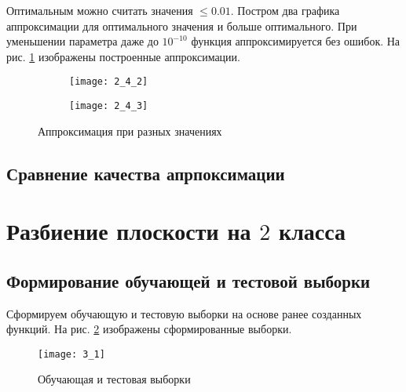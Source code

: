 Оптимальным можно считать значения  $\leq 0.01$. Постром два графика аппроксимации для оптимального значения  и больше оптимального. При уменьшении параметра даже до $10^{-10}$ функция аппроксимируется без ошибок. На рис. \ref{fig:2_4_2} изображены построенные аппроксимации.
\begin{figure}[H]
\begin{center}
	\begin{subfigure}{0.49\textwidth}
		\texttt{[image: 2\_4\_2]}
		\caption{}
	\end{subfigure}
	\begin{subfigure}{0.49\textwidth}
		\texttt{[image: 2\_4\_3]}
		\caption{}
	\end{subfigure}
	\caption{Аппроксимация при разных значениях }
	\label{fig:2_4_2}
\end{center}
\end{figure}

\subsection{Сравнение качества апрпоксимации}


\newpage

\section{Разбиение плоскости на $2$ класса}

\subsection{Формирование обучающей и тестовой выборки}


Сформируем обучающую и тестовую выборки на основе ранее созданных функций. На рис. \ref{fig:3_1} изображены сформированные выборки.
\begin{figure}[H]
\begin{center}
	\texttt{[image: 3\_1]}
	\caption{Обучающая и тестовая выборки}
	\label{fig:3_1}
\end{center}
\end{figure}

